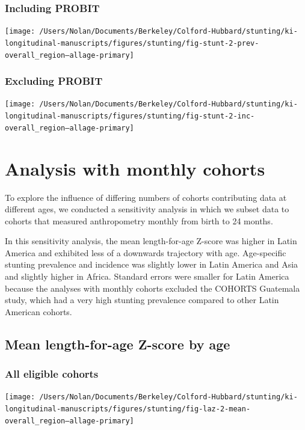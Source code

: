 \documentclass[9pt,]{book}
\begin{document}
\subsection{Including PROBIT}\label{including-probit-2}

\texttt{[image: /Users/Nolan/Documents/Berkeley/Colford-Hubbard/stunting/ki-longitudinal-manuscripts/figures/stunting/fig-stunt-2-prev-overall\_region--allage-primary]}

\subsection{Excluding PROBIT}\label{excluding-probit-2}

\texttt{[image: /Users/Nolan/Documents/Berkeley/Colford-Hubbard/stunting/ki-longitudinal-manuscripts/figures/stunting/fig-stunt-2-inc-overall\_region--allage-primary]}

\chapter{Analysis with monthly cohorts}\label{monthly}

\raggedright

To explore the influence of differing numbers of cohorts contributing
data at different ages, we conducted a sensitivity analysis in which we
subset data to cohorts that measured anthropometry monthly from birth to
24 months.

In this sensitivity analysis, the mean length-for-age Z-score was higher
in Latin America and exhibited less of a downwards trajectory with age.
Age-specific stunting prevalence and incidence was slightly lower in
Latin America and Asia and slightly higher in Africa. Standard errors
were smaller for Latin America because the analyses with monthly cohorts
excluded the COHORTS Guatemala study, which had a very high stunting
prevalence compared to other Latin American cohorts.

\section{Mean length-for-age Z-score by
age}\label{mean-length-for-age-z-score-by-age-2}

\subsection{All eligible cohorts}\label{all-eligible-cohorts}

\texttt{[image: /Users/Nolan/Documents/Berkeley/Colford-Hubbard/stunting/ki-longitudinal-manuscripts/figures/stunting/fig-laz-2-mean-overall\_region--allage-primary]}
\end{document}
